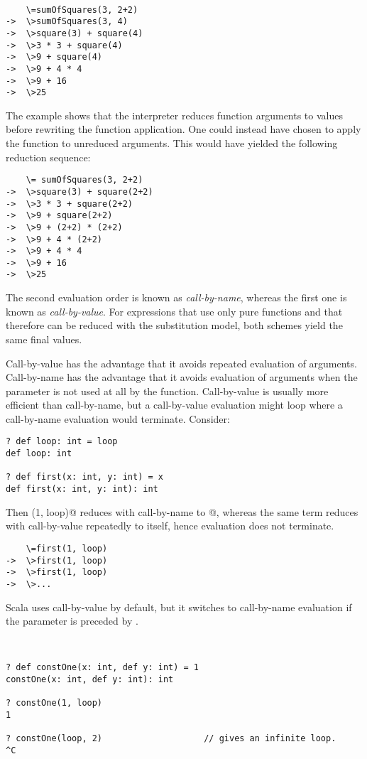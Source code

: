 \documentclass[11pt]{book}
\begin{document}
\example\ 
 
\begin{verbatim}
    \=sumOfSquares(3, 2+2)
->  \>sumOfSquares(3, 4)
->  \>square(3) + square(4)
->  \>3 * 3 + square(4)
->  \>9 + square(4)
->  \>9 + 4 * 4
->  \>9 + 16
->  \>25
\end{verbatim}

The example shows that the interpreter reduces function arguments to
values before rewriting the function application.  One could instead
have chosen to apply the function to unreduced arguments. This would
have yielded the following reduction sequence:
\begin{verbatim}
    \= sumOfSquares(3, 2+2)
->  \>square(3) + square(2+2)
->  \>3 * 3 + square(2+2)
->  \>9 + square(2+2)
->  \>9 + (2+2) * (2+2)
->  \>9 + 4 * (2+2)
->  \>9 + 4 * 4
->  \>9 + 16
->  \>25
\end{verbatim}

The second evaluation order is known as \emph{call-by-name},
whereas the first one is known as \emph{call-by-value}.  For
expressions that use only pure functions and that therefore can be
reduced with the substitution model, both schemes yield the same final
values.  

Call-by-value has the advantage that it avoids repeated evaluation of
arguments. Call-by-name has the advantage that it avoids evaluation of
arguments when the parameter is not used at all by the function.
Call-by-value is usually more efficient than call-by-name, but a
call-by-value evaluation might loop where a call-by-name evaluation
would terminate. Consider:
\begin{verbatim}
? def loop: int = loop
def loop: int

? def first(x: int, y: int) = x
def first(x: int, y: int): int
\end{verbatim}
Then \verb@first(1, loop)@ reduces with call-by-name to @,
whereas the same term reduces with call-by-value repeatedly to itself,
hence evaluation does not terminate.
\begin{verbatim}
    \=first(1, loop)
->  \>first(1, loop)
->  \>first(1, loop)
->  \>...
\end{verbatim}
Scala uses call-by-value by default, but it switches to call-by-name evaluation
if the parameter is preceded by \verb@def@.

\example\ 
 
\begin{verbatim}
? def constOne(x: int, def y: int) = 1
constOne(x: int, def y: int): int

? constOne(1, loop)
1

? constOne(loop, 2)                    // gives an infinite loop.
^C
\end{verbatim}
\end{document}
